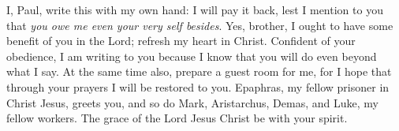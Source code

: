 \begin{biblechapter}
\verse I, Paul, write this with my own hand: I will pay it back, lest I mention to you that \textit{you owe me even your very self besides}.
\verse Yes, brother, I ought to have some benefit of you in the Lord; refresh my heart in Christ.
\verse Confident of your obedience, I am writing to you because I know that you will do even beyond what I say.
\verse At the same time also, prepare a guest room for me, for I hope that through your prayers I will be restored to you.
 Epaphras, my fellow prisoner in Christ Jesus, greets you,
\verse and so do Mark, Aristarchus, Demas, and Luke, my fellow workers.
\verse The grace of the Lord Jesus Christ be with your spirit.
\end{biblechapter}

